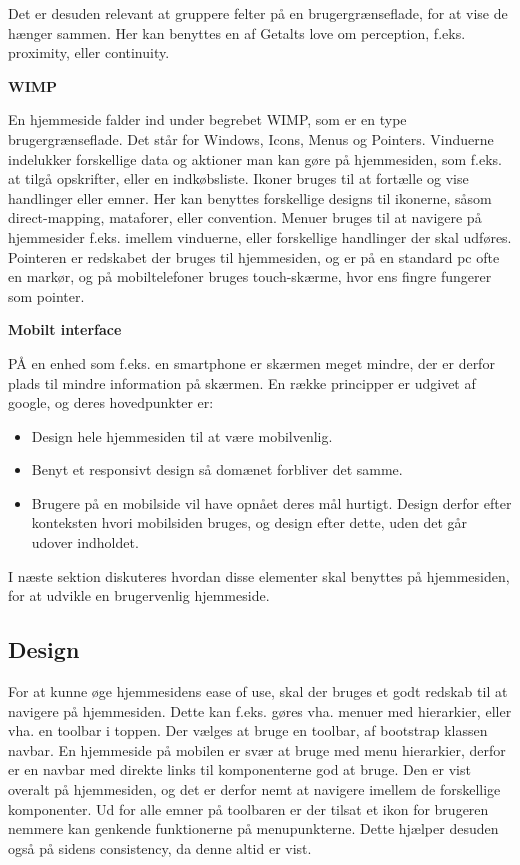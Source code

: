 Det er desuden relevant at gruppere felter på en brugergrænseflade, for at vise de hænger sammen. Her kan benyttes en af Getalts love om perception, f.eks. proximity, eller continuity.

\textbf{WIMP}

En hjemmeside falder ind under begrebet WIMP, som er en type brugergrænseflade. Det står for Windows, Icons, Menus og Pointers.
Vinduerne indelukker forskellige data og aktioner man kan gøre på hjemmesiden, som f.eks. at tilgå opskrifter, eller en indkøbsliste.
Ikoner bruges til at fortælle og vise handlinger eller emner.
Her kan benyttes forskellige designs til ikonerne, såsom direct-mapping, mataforer, eller convention.
Menuer bruges til at navigere på hjemmesider f.eks. imellem vinduerne, eller forskellige handlinger der skal udføres.
Pointeren er redskabet der bruges til hjemmesiden, og er på en standard pc ofte en markør, og på mobiltelefoner bruges touch-skærme, hvor ens fingre fungerer som pointer.


\textbf{Mobilt interface}

PÅ en enhed som f.eks. en smartphone er skærmen meget mindre, der er derfor plads til mindre information på skærmen. 
En række principper er udgivet af google\citep{Mobil}, og deres hovedpunkter er:
\begin{itemize}
	\item Design hele hjemmesiden til at være mobilvenlig.
	\item Benyt et responsivt design så domænet forbliver det samme.
	\item Brugere på en mobilside vil have opnået deres mål hurtigt. Design derfor efter konteksten hvori mobilsiden bruges, og design efter dette, uden det går udover indholdet.
\end{itemize}

I næste sektion diskuteres hvordan disse elementer skal benyttes på hjemmesiden, for at udvikle en brugervenlig hjemmeside.

\subsection{Design}

For at kunne øge hjemmesidens ease of use, skal der bruges et godt redskab til at navigere på hjemmesiden.
Dette kan f.eks. gøres vha. menuer med hierarkier, eller vha. en toolbar i toppen.
Der vælges at bruge en toolbar, af bootstrap klassen navbar. 
En hjemmeside på mobilen er svær at bruge med menu hierarkier, derfor er en navbar med direkte links til komponenterne god at bruge. 
Den er vist overalt på hjemmesiden, og det er derfor nemt at navigere imellem de forskellige komponenter.
Ud for alle emner på toolbaren er der tilsat et ikon for brugeren nemmere kan genkende funktionerne på menupunkterne.
Dette hjælper desuden også på sidens consistency, da denne altid er vist.

